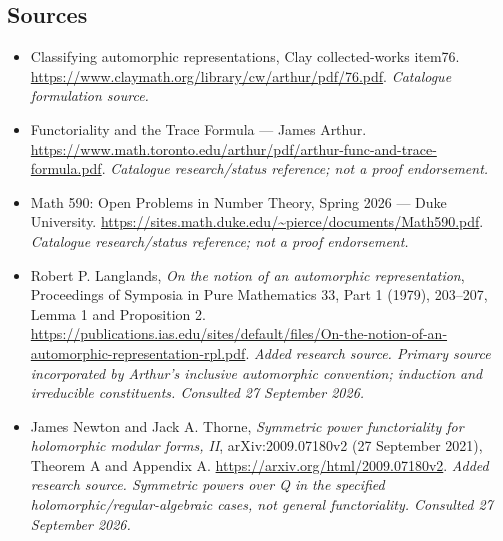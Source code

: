 \documentclass[11pt,a4paper]{article}
\begin{document}
\subsection{Sources}
\begin{itemize}\raggedright
\item[\textnormal{[S1]}]\hypertarget{source:30006675:1}{} Classifying automorphic representations, Clay collected-works item76.
\url{https://www.claymath.org/library/cw/arthur/pdf/76.pdf}.
{\small\textit{Catalogue formulation source.}}
\item[\textnormal{[S2]}]\hypertarget{source:30006675:2}{} Functoriality and the Trace Formula — James Arthur.
\url{https://www.math.toronto.edu/arthur/pdf/arthur-func-and-trace-formula.pdf}.
{\small\textit{Catalogue research/status reference; not a proof endorsement.}}
\item[\textnormal{[S3]}]\hypertarget{source:30006675:3}{} Math 590: Open Problems in Number Theory, Spring 2026 — Duke University.
\url{https://sites.math.duke.edu/~pierce/documents/Math590.pdf}.
{\small\textit{Catalogue research/status reference; not a proof endorsement.}}
\item[\textnormal{[E1]}]\hypertarget{extra:30006675:1}{} Robert P. Langlands, \emph{On the notion of an automorphic representation}, Proceedings of Symposia in Pure Mathematics 33, Part 1 (1979), 203--207, Lemma 1 and Proposition 2.
\url{https://publications.ias.edu/sites/default/files/On-the-notion-of-an-automorphic-representation-rpl.pdf}.
{\small\textit{Added research source. Primary source incorporated by Arthur's inclusive automorphic convention; induction and irreducible constituents. Consulted 27 September 2026.}}
\item[\textnormal{[E2]}]\hypertarget{extra:30006675:2}{} James Newton and Jack A. Thorne, \emph{Symmetric power functoriality for holomorphic modular forms, II}, arXiv:2009.07180v2 (27 September 2021), Theorem A and Appendix A.
\url{https://arxiv.org/html/2009.07180v2}.
{\small\textit{Added research source. Symmetric powers over Q in the specified holomorphic/regular-algebraic cases, not general functoriality. Consulted 27 September 2026.}}
\end{itemize}

\end{document}
